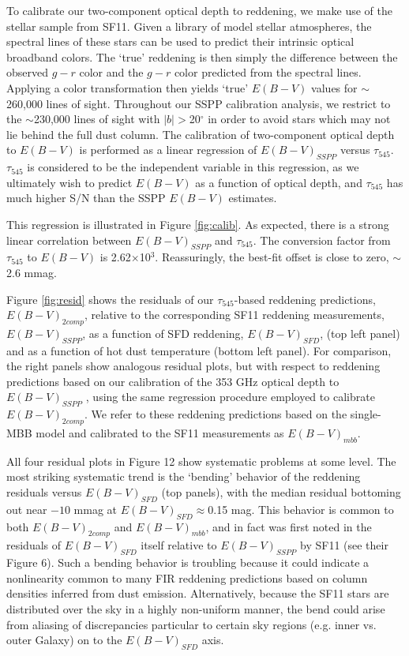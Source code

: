 \documentclass{emulateapj}
\begin{document}
To calibrate our two-component optical depth to reddening, we make use of the 
stellar sample from SF11. Given a library of model stellar atmospheres, the 
spectral lines of these stars can be used to predict their intrinsic optical 
broadband colors. The `true' reddening is then simply the difference between 
the observed $g-r$ color and the $g-r$ color predicted from the spectral lines.
Applying a color transformation then yields `true' $E(B-V)$ values for 
$\sim$260,000 lines of sight. Throughout our SSPP calibration analysis, we 
restrict to the $\sim$230,000 lines of sight with $|b|$$>$20$^{\circ}$ in order
to avoid stars which may not lie behind the full dust column. The calibration 
of two-component optical depth to $E(B-V)$ is performed as a linear regression 
of $E(B-V)_{SSPP}$ versus $\tau_{545}$. $\tau_{545}$ is considered to be the 
independent variable in this regression, as we ultimately wish to predict 
$E(B-V)$ as a function of optical depth, and $\tau_{545}$ has much higher S/N 
than the SSPP $E(B-V)$ estimates.

This regression is illustrated in Figure \ref{fig:calib}. As expected, there 
is a strong linear correlation between $E(B-V)_{SSPP}$ and $\tau_{545}$. The 
conversion factor from $\tau_{545}$ to $E(B-V)$ is 2.62$\times$10$^{3}$. 
Reassuringly, the best-fit offset is close to zero, $\sim$2.6 mmag.

Figure \ref{fig:resid} shows the residuals of our $\tau_{545}$-based reddening 
predictions, $E(B-V)_{2comp}$, relative to the corresponding SF11 reddening 
measurements, $E(B-V)_{SSPP}$, as a function of SFD reddening, $E(B-V)_{SFD}$, 
(top left panel) and as a function of hot dust temperature (bottom left panel).
For comparison, the right panels show analogous residual plots, but with 
respect to reddening predictions based on our calibration of the 
\cite{planckdust} 353 GHz optical depth to $E(B-V)_{SSPP}$ , using the same 
regression procedure employed to calibrate $E(B-V)_{2comp}$. We refer to these 
reddening predictions based on the \cite{planckdust} single-MBB model and 
calibrated to the SF11 measurements as $E(B-V)_{mbb}$.

All four residual plots in Figure 12 show systematic problems at some level. 
The most striking systematic trend is the `bending' behavior of the reddening
residuals versus $E(B-V)_{SFD}$ (top panels), with the median residual 
bottoming out near $-10$ mmag at $E(B-V)_{SFD}$$\approx$0.15 mag. This behavior
is common to both $E(B-V)_{2comp}$ and $E(B-V)_{mbb}$, and in fact was first 
noted in the residuals of $E(B-V)_{SFD}$ itself relative to $E(B-V)_{SSPP}$ by 
SF11 (see their Figure 6). Such a bending behavior is troubling because it 
could indicate a nonlinearity common to many FIR reddening predictions based on
column densities inferred from dust emission. Alternatively, because the SF11 
stars are distributed over the sky in a highly non-uniform manner, the bend 
could arise from aliasing of discrepancies particular to certain sky regions 
(e.g. inner vs. outer Galaxy) on to the $E(B-V)_{SFD}$ axis.
\end{document}
